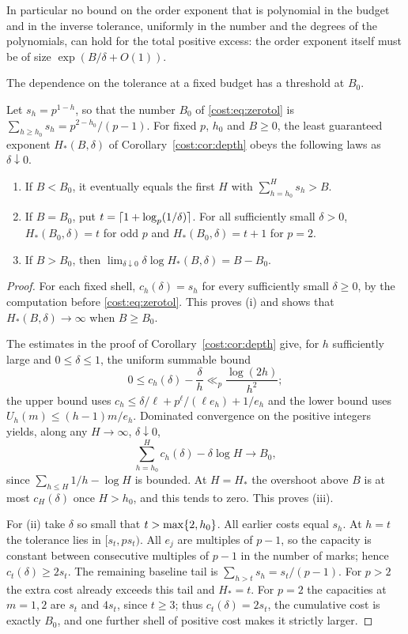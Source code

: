 In particular no bound on the order exponent that is polynomial in the budget and in the
inverse tolerance, uniformly in the number and the degrees of the polynomials, can hold for
the total positive excess: the order exponent itself must be of size $\exp(B/\delta+O(1))$.

The dependence on the tolerance at a fixed budget has a threshold at $B_0$.

\begin{theorem}\label{cost:thm:transition}
Let $s_h=p^{1-h}$, so that the number $B_0$ of \eqref{cost:eq:zerotol} is
$\sum_{h\ge h_0}s_h=p^{2-h_0}/(p-1)$. For fixed $p$, $h_0$ and
$B\ge0$, the least guaranteed exponent $H_*(B,\delta)$ of Corollary~\ref{cost:cor:depth} obeys the
following laws as $\delta\downarrow0$.
\begin{enumerate}[label=\textup{(\roman*)}]
\item If $B<B_0$, it eventually equals the first $H$ with $\sum_{h=h_0}^Hs_h>B$.
\item If $B=B_0$, put $t=\lceil1+\log_p(1/\delta)\rceil$. For all sufficiently small
$\delta>0$, $H_*(B_0,\delta)=t$ for odd $p$ and $H_*(B_0,\delta)=t+1$ for $p=2$.
\item If $B>B_0$, then $\lim_{\delta\downarrow0}\delta\log H_*(B,\delta)=B-B_0$.
\end{enumerate}
\end{theorem}

\begin{proof}
For each fixed shell, $c_h(\delta)=s_h$ for every sufficiently small $\delta\ge0$, by the
computation before \eqref{cost:eq:zerotol}. This proves (i) and shows that
$H_*(B,\delta)\to\infty$ when $B\ge B_0$.

The estimates in the proof of Corollary~\ref{cost:cor:depth} give, for $h$ sufficiently large and
$0\le\delta\le1$, the uniform summable bound
\[
 0\le c_h(\delta)-\frac\delta h\ll_p\frac{\log(2h)}{h^2};
\]
the upper bound uses $c_h\le\delta/\ell+p^\ell/(\ell e_h)+1/e_h$ and the lower bound uses
$U_h(m)\le(h-1)m/e_h$. Dominated convergence on the positive integers yields, along any
$H\to\infty$, $\delta\downarrow0$,
\[
 \sum_{h=h_0}^Hc_h(\delta)-\delta\log H\longrightarrow B_0,
\]
since $\sum_{h\le H}1/h-\log H$ is bounded. At $H=H_*$ the overshoot above $B$ is at most
$c_H(\delta)$ once $H>h_0$, and this tends to zero. This proves (iii).

For (ii) take $\delta$ so small that $t>\max\{2,h_0\}$. All earlier costs equal $s_h$. At
$h=t$ the tolerance lies in $[s_t,ps_t)$. All $e_j$ are multiples of $p-1$, so the capacity
is constant between consecutive multiples of $p-1$ in the number of marks; hence
$c_t(\delta)\ge2s_t$. The remaining baseline tail is $\sum_{h>t}s_h=s_t/(p-1)$. For $p>2$
the extra cost already exceeds this tail and $H_*=t$. For $p=2$ the capacities at $m=1,2$
are $s_t$ and $4s_t$, since $t\ge3$; thus $c_t(\delta)=2s_t$, the cumulative cost is exactly
$B_0$, and one further shell of positive cost makes it strictly larger.
\end{proof}

